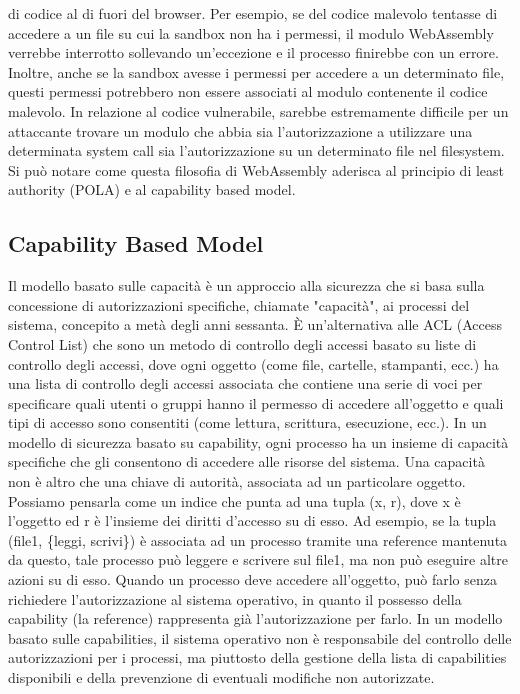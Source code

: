 di codice al di fuori del browser. Per esempio, se del codice malevolo tentasse di accedere a un file su cui la sandbox
non ha i permessi, il modulo WebAssembly verrebbe interrotto sollevando un'eccezione e il processo finirebbe con un
errore. Inoltre, anche se la sandbox avesse i permessi per accedere a un determinato file, questi permessi potrebbero
non essere associati al modulo contenente il codice malevolo. In relazione al codice vulnerabile, sarebbe estremamente
difficile per un attaccante trovare un modulo che abbia sia l'autorizzazione a utilizzare una determinata system call
sia l'autorizzazione su un determinato file nel filesystem. \\ Si può notare come questa filosofia di WebAssembly
aderisca al principio di least authority (POLA) e al capability based model.
\subsection{Capability Based Model}
Il modello basato sulle capacità è un approccio alla sicurezza che si basa sulla concessione di autorizzazioni
specifiche, chiamate "capacità", ai processi del sistema, concepito a metà degli anni
sessanta\cite{capability-based-security}. È un'alternativa alle ACL (Access Control List) che sono un metodo di
controllo degli accessi basato su liste di controllo degli accessi, dove ogni oggetto (come file, cartelle, stampanti,
ecc.) ha una lista di controllo degli accessi associata che contiene una serie di voci per specificare quali utenti o
gruppi hanno il permesso di accedere all'oggetto e quali tipi di accesso sono consentiti (come lettura, scrittura,
esecuzione, ecc.). In un modello di sicurezza basato su capability, ogni processo ha un insieme di capacità specifiche
che gli consentono di accedere alle risorse del sistema. Una capacità non è altro che una chiave di autorità, associata
ad un particolare oggetto. Possiamo pensarla come un indice che punta ad una tupla (x, r), dove x è l'oggetto ed r è
l'insieme dei diritti d'accesso su di esso. Ad esempio, se la tupla (file1, \{leggi, scrivi\}) è associata ad un
processo tramite una reference mantenuta da questo, tale processo può leggere e scrivere sul file1, ma non può eseguire
altre azioni su di esso. Quando un processo deve accedere all'oggetto, può farlo senza richiedere l'autorizzazione al
sistema operativo, in quanto il possesso della capability (la reference) rappresenta già l'autorizzazione per farlo. In
un modello basato sulle capabilities, il sistema operativo non è responsabile del controllo delle autorizzazioni per i
processi, ma piuttosto della gestione della lista di capabilities disponibili e della prevenzione di eventuali modifiche
non autorizzate.
